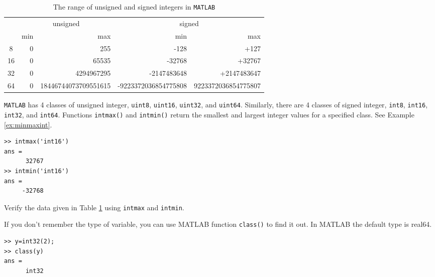 \begin{table}[tb]
\centering
\caption{The range of unsigned and signed integers in \texttt{MATLAB}}
\label{tbl:int_range}
\begin{tabular}{c|rr|rr }
\hline
& \multicolumn{2}{|c}{unsigned} & \multicolumn{2}{|c}{signed} \\
\cline{2-5}
\raisebox{6pt}{bits} & min & max & min & max \\
 \hline
8 & 0 & 255 & -128 & +127 \\
16 & 0 & 65535 & -32768 & +32767 \\
32 & 0 & 4294967295 & -2147483648 & +2147483647\\
64 & 0 & 18446744073709551615 & -9223372036854775808
& 9223372036854775807 \\
\hline
\end{tabular}
\end{table}

\texttt{MATLAB} has 4 classes of unsigned integer, \texttt{uint8},
\texttt{uint16},  \texttt{uint32}, and  \texttt{uint64}.  Similarly, there are 4 classes of signed integer, \texttt{int8},
\texttt{int16},  \texttt{int32}, and  \texttt{int64}.
Functions \texttt{intmax()} and \texttt{intmin()} return the smallest and largest integer values for a specified class. See Example \ref{ex:minmaxint}.  

\noindent
\begin{example}\label{ex:minmaxint}
\small
\begin{mybox}
\begin{verbatim}
>> intmax('int16')
ans =
      32767
>> intmin('int16')
ans =
     -32768
\end{verbatim}
\end{mybox}
\normalsize
\end{example}

\noindent
\exercise
Verify the data given in Table \ref{tbl:int_range} using \texttt{intmax} and \texttt{intmin}.

\bigskip
If you don't remember the type of variable, you can use MATLAB function \texttt{class()} to find it out.
In MATLAB the default type is real64.

\noindent
\begin{example}\label{ex:minmaxint}
\small
\begin{mybox}
\begin{verbatim}
>> y=int32(2);
>> class(y)
ans =
      int32
\end{verbatim}
\end{mybox}
\normalsize
\end{example}


